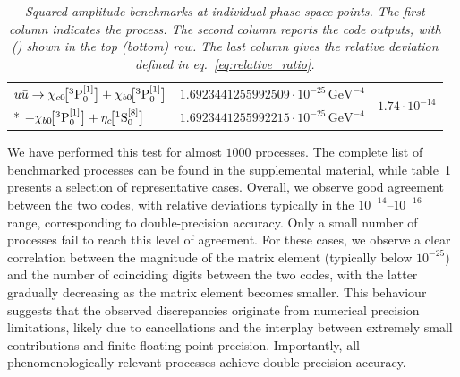 \begin{table}[H]
\begin{tabular}[t]{lcc}
{$u \bar{u} \to \chi_{c0}\!\big[{}^3\mathrm{P}_{0}^{[1]}\big]+ \chi_{b0}\!\big[{}^3\mathrm{P}_{0}^{[1]}\big]$} & $1.6923441255992509 \cdot 10^{-25}\,\mathrm{GeV}^{-4}$ & \multirow{2}{*}{$1.74 \cdot 10^{-14}$} \\*
{\qquad\qquad$+\chi_{b0}\!\big[{}^3\mathrm{P}_{0}^{[1]}\big]+\eta_c\!\big[{}^1\mathrm{S}_{0}^{[8]}\big]$} & $1.6923441255992215 \cdot 10^{-25}\,\mathrm{GeV}^{-4}$ & \\

\bottomrule
\end{tabular}
\caption{\it\small Squared-amplitude benchmarks at individual phase-space points. The first column indicates the process. The second column reports the code outputs, with {\tt \mgshort} ({\tt \helaconia}) shown in the top (bottom) row. The last column gives the relative deviation defined in eq.~\eqref{eq:relative_ratio}. 
}
\label{tab:sa_check}
\end{table}\vspace*{-2\baselineskip}
\makeatletter
\renewcommand{\thefootnote}{QED}
\begingroup
  \renewcommand{\@makefnmark}{}%
  \footnotemark
\endgroup
{}
\renewcommand*{\thefootnote}{\arabic{footnote}}
\makeatother
\addtocounter{footnote}{-1}

We have performed this test for almost $1000$ processes. The complete list of benchmarked processes can be found in the supplemental material, while table~\ref{tab:sa_check} presents a selection of representative cases. 
Overall, we observe good agreement between the two codes, with relative deviations typically in the $10^{-14}\textrm{--}10^{-16}$ range, corresponding to double-precision accuracy. Only a small number of processes fail to reach this level of agreement. For these cases, we observe a clear correlation between the magnitude of the matrix element (typically below $10^{-25}$) and the number of coinciding digits between the two codes, with the latter gradually decreasing as the matrix element becomes smaller. This behaviour suggests that the observed discrepancies originate from numerical precision limitations, likely due to cancellations and the interplay between extremely small contributions and finite floating-point precision. 
Importantly, all phenomenologically relevant processes achieve double-precision accuracy.


